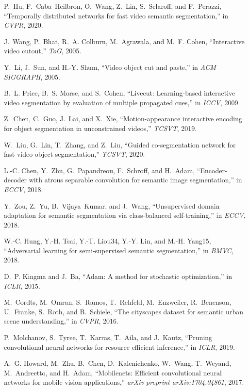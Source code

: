 \documentclass[journal]{IEEEtran}
\begin{document}
\begin{thebibliography}{10}
	P.~Hu, F.~Caba~Heilbron, O.~Wang, Z.~Lin, S.~Sclaroff, and F.~Perazzi,
	``Temporally distributed networks for fast video semantic segmentation,'' in
	\emph{CVPR}, 2020.
	
	J.~Wang, P.~Bhat, R.~A. Colburn, M.~Agrawala, and M.~F. Cohen, ``Interactive
	video cutout,'' \emph{ToG}, 2005.
	
	Y.~Li, J.~Sun, and H.-Y. Shum, ``Video object cut and paste,'' in \emph{ACM
		SIGGRAPH}, 2005.
	
	B.~L. Price, B.~S. Morse, and S.~Cohen, ``Livecut: Learning-based interactive
	video segmentation by evaluation of multiple propagated cues,'' in
	\emph{ICCV}, 2009.
	
	Z.~Chen, C.~Guo, J.~Lai, and X.~Xie, ``Motion-appearance interactive encoding
	for object segmentation in unconstrained videos,'' \emph{TCSVT}, 2019.
	
	W.~Liu, G.~Lin, T.~Zhang, and Z.~Liu, ``Guided co-segmentation network for fast
	video object segmentation,'' \emph{TCSVT}, 2020.
	
	L.-C. Chen, Y.~Zhu, G.~Papandreou, F.~Schroff, and H.~Adam, ``Encoder-decoder
	with atrous separable convolution for semantic image segmentation,'' in
	\emph{ECCV}, 2018.
	
	Y.~Zou, Z.~Yu, B.~Vijaya~Kumar, and J.~Wang, ``Unsupervised domain adaptation
	for semantic segmentation via class-balanced self-training,'' in \emph{ECCV},
	2018.
	
	W.-C. Hung, Y.-H. Tsai, Y.-T. Liou34, Y.-Y. Lin, and M.-H. Yang15,
	``Adversarial learning for semi-supervised semantic segmentation,'' in
	\emph{BMVC}, 2018.
	
	D.~P. Kingma and J.~Ba, ``Adam: A method for stochastic optimization,'' in
	\emph{ICLR}, 2015.
	
	M.~Cordts, M.~Omran, S.~Ramos, T.~Rehfeld, M.~Enzweiler, R.~Benenson,
	U.~Franke, S.~Roth, and B.~Schiele, ``The cityscapes dataset for semantic
	urban scene understanding,'' in \emph{CVPR}, 2016.
	
	P.~Molchanov, S.~Tyree, T.~Karras, T.~Aila, and J.~Kautz, ``Pruning
	convolutional neural networks for resource efficient inference,'' in
	\emph{ICLR}, 2019.
	
	A.~G. Howard, M.~Zhu, B.~Chen, D.~Kalenichenko, W.~Wang, T.~Weyand,
	M.~Andreetto, and H.~Adam, ``Mobilenets: Efficient convolutional neural
	networks for mobile vision applications,'' \emph{arXiv preprint
		arXiv:1704.04861}, 2017.
	
\end{thebibliography}
\end{document}
